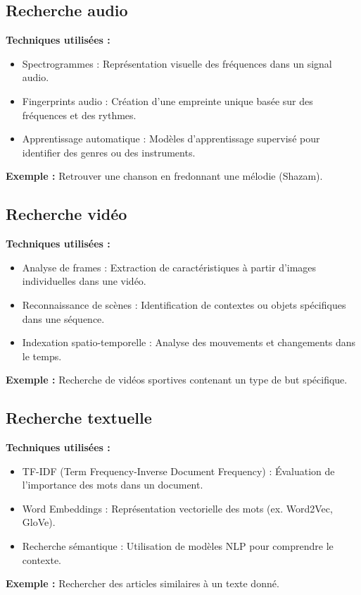 \begin{section}
\subsection{Recherche audio}
\textbf{Techniques utilisées :}
\begin{itemize}
    \item Spectrogrammes : Représentation visuelle des fréquences dans un signal audio.
    \item Fingerprints audio : Création d’une empreinte unique basée sur des fréquences et des rythmes.
    \item Apprentissage automatique : Modèles d’apprentissage supervisé pour identifier des genres ou des instruments.
\end{itemize}
\textbf{Exemple :} Retrouver une chanson en fredonnant une mélodie (Shazam).

\subsection{ Recherche vidéo}
\textbf{Techniques utilisées :}
\begin{itemize}
    \item Analyse de frames : Extraction de caractéristiques à partir d’images individuelles dans une vidéo.
    \item Reconnaissance de scènes : Identification de contextes ou objets spécifiques dans une séquence.
    \item Indexation spatio-temporelle : Analyse des mouvements et changements dans le temps.
\end{itemize}
\textbf{Exemple :} Recherche de vidéos sportives contenant un type de but spécifique.

\subsection{ Recherche textuelle}
\textbf{Techniques utilisées :}
\begin{itemize}
    \item TF-IDF (Term Frequency-Inverse Document Frequency) : Évaluation de l’importance des mots dans un document.
    \item Word Embeddings : Représentation vectorielle des mots (ex. Word2Vec, GloVe).
    \item Recherche sémantique : Utilisation de modèles NLP pour comprendre le contexte.
\end{itemize}
\textbf{Exemple :} Rechercher des articles similaires à un texte donné.


\end{section}
